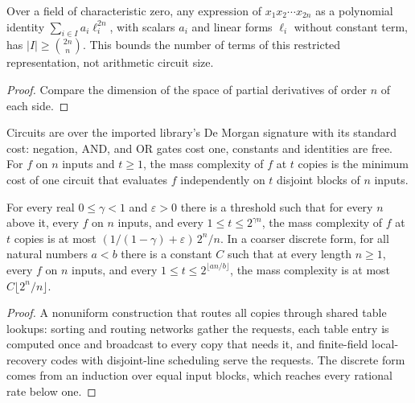 \begin{theorem}
  \label{thm:lowerbounds-algebraic-waring}
  \leanok
  Over a field of characteristic zero, any expression of $x_1 x_2 \cdots x_{2n}$
  as a polynomial identity $\sum_{i \in I} a_i \ell_i^{2n}$, with scalars $a_i$
  and linear forms $\ell_i$ without constant term, has
  $\lvert I \rvert \ge \binom{2n}{n}$. This bounds the number of terms of this
  restricted representation, not arithmetic circuit size.
\end{theorem}
\begin{proof}
  \leanok
  Compare the dimension of the space of partial derivatives of order $n$ of
  each side.
\end{proof}

\begin{theorem}
  \label{thm:lowerbounds-algebraic-mass-production}
  \leanok
  Circuits are over the imported library's De Morgan signature with its
  standard cost: negation, AND, and OR gates cost one, constants and identities
  are free. For $f$ on $n$ inputs and $t \ge 1$, the mass complexity of $f$ at
  $t$ copies is the minimum cost of one circuit that evaluates $f$
  independently on $t$ disjoint blocks of $n$ inputs.

  For every real $0 \le \gamma < 1$ and $\varepsilon > 0$ there is a threshold
  such that for every $n$ above it, every $f$ on $n$ inputs, and every
  $1 \le t \le 2^{\gamma n}$, the mass complexity of $f$ at $t$ copies is at
  most $(1/(1 - \gamma) + \varepsilon)\, 2^n / n$. In a coarser discrete form,
  for all natural numbers $a < b$ there is a constant $C$ such that at every
  length $n \ge 1$, every $f$ on $n$ inputs, and every
  $1 \le t \le 2^{\lfloor a n / b \rfloor}$, the mass complexity is at most
  $C \lfloor 2^n / n \rfloor$.
\end{theorem}
\begin{proof}
  \leanok
  A nonuniform construction that routes all copies through shared table
  lookups: sorting and routing networks gather the requests, each table entry
  is computed once and broadcast to every copy that needs it, and finite-field
  local-recovery codes with disjoint-line scheduling serve the requests. The
  discrete form comes from an induction over equal input blocks, which reaches
  every rational rate below one.
\end{proof}

